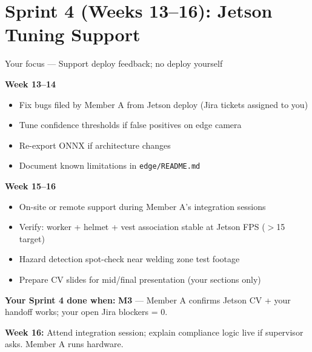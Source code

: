 \documentclass[12pt,a4paper]{article}
\begin{document}
\section{Sprint 4 (Weeks 13--16): Jetson Tuning Support}

\begin{sprintbox}{Your focus --- Support deploy feedback; no deploy yourself}

\begin{taskbox}
\textbf{Week 13--14}
\begin{itemize}
    \item Fix bugs filed by Member A from Jetson deploy (Jira tickets assigned to you)
    \item Tune confidence thresholds if false positives on edge camera
    \item Re-export ONNX if architecture changes
    \item Document known limitations in \texttt{edge/README.md}
\end{itemize}
\end{taskbox}

\begin{taskbox}
\textbf{Week 15--16}
\begin{itemize}
    \item On-site or remote support during Member A's integration sessions
    \item Verify: worker + helmet + vest association stable at Jetson FPS ($>$15 target)
    \item Hazard detection spot-check near welding zone test footage
    \item Prepare CV slides for mid/final presentation (your sections only)
\end{itemize}
\end{taskbox}

\begin{deliverablebox}
\textbf{Your Sprint 4 done when:} \textbf{M3} --- Member A confirms Jetson CV + your handoff works; your open Jira blockers = 0.
\end{deliverablebox}

\begin{collabbox}
\textbf{Week 16:} Attend integration session; explain compliance logic live if supervisor asks. Member A runs hardware.
\end{collabbox}

\end{sprintbox}
\end{document}
